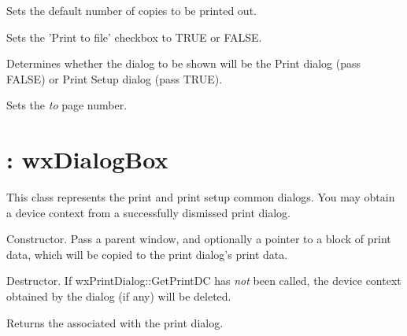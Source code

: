 Sets the default number of copies to be printed out.



Sets the 'Print to file' checkbox to TRUE or FALSE.



Determines whether the dialog to be shown will be the Print dialog
(pass FALSE) or Print Setup dialog (pass TRUE).



Sets the {\it to} page number.

\section{: wxDialogBox}\label{wxprintdialog}


This class represents the print and print setup common dialogs.
You may obtain a  device context from
a successfully dismissed print dialog.



Constructor. Pass a parent window, and optionally a pointer to a block of print
data, which will be copied to the print dialog's print data.



Destructor. If wxPrintDialog::GetPrintDC has {\it not} been called,
the device context obtained by the dialog (if any) will be deleted.



Returns the  associated with the print dialog.


